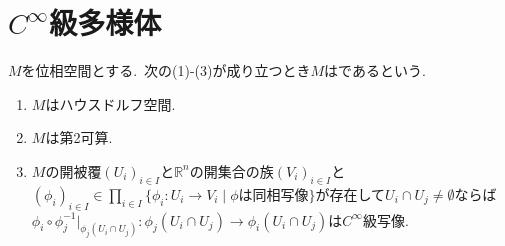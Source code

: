 
\section{$C^{\infty}$級多様体}
\begin{definition}
$M$を位相空間とする.\
次の(1)-(3)が成り立つとき$M$はであるという.
\def\labelenumi{(\theenumi)\hspace{.5\zw}}
\begin{enumerate}
  \item $M$はハウスドルフ空間.
  \item $M$は第2可算.
  \item $M$の開被覆$(U_i)_{i \in I}$と$\mathbb{R}^n$の開集合の族$(V_i)_{i \in I}$と$(\phi_i)_{i \in I} \in \prod_{i \in I} \{\phi_i \colon U_i \to V_i \mid \phi\text{は同相写像} \}$が存在して$U_i \cap U_j \neq \emptyset$ならば$\phi_i \circ \phi_j^{-1} \vert_{\phi_j(U_i \cap U_j)} \colon \phi_j(U_i \cap U_j) \to \phi_i(U_i \cap U_j)$は$C^{\infty}$級写像.
\end{enumerate}
\end{definition}
